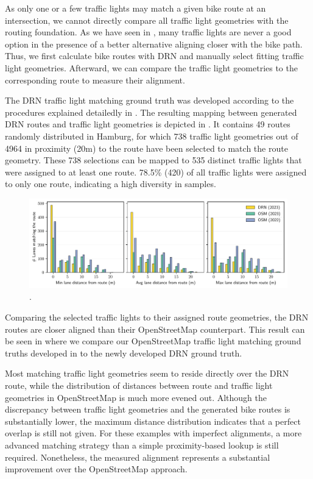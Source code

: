 As only one or a few traffic lights may match a given bike route at an intersection, we cannot directly compare all traffic light geometries with the routing foundation. As we have seen in , many traffic lights are never a good option in the presence of a better alternative aligning closer with the bike path. Thus, we first calculate bike routes with DRN and manually select fitting traffic light geometries. Afterward, we can compare the traffic light geometries to the corresponding route to measure their alignment. 

The DRN traffic light matching ground truth was developed according to the procedures explained detailedly in . The resulting mapping between generated DRN routes and traffic light geometries is depicted in . It contains 49 routes randomly distributed in Hamburg, for which 738 traffic light geometries out of 4964 in proximity (20m) to the route have been selected to match the route geometry. These 738 selections can be mapped to 535 distinct traffic lights that were assigned to at least one route. 78.5\% (420) of all traffic lights were assigned to only one route, indicating a high diversity in samples.

\begin{figure}[t]
\centering 
\includegraphics[width=\linewidth]{images/routing-lane-alignment.pdf}
\caption{.}
\label{fig:routing-lane-alignment}
\end{figure}

Comparing the selected traffic lights to their assigned route geometries, the DRN routes are closer aligned than their OpenStreetMap counterpart. This result can be seen in  where we compare our OpenStreetMap traffic light matching ground truths developed in  to the newly developed DRN ground truth. 

Most matching traffic light geometries seem to reside directly over the DRN route, while the distribution of distances between route and traffic light geometries in OpenStreetMap is much more evened out. Although the discrepancy between traffic light geometries and the generated bike routes is substantially lower, the maximum distance distribution indicates that a perfect overlap is still not given. For these examples with imperfect alignments, a more advanced matching strategy than a simple proximity-based lookup is still required. Nonetheless, the measured alignment represents a substantial improvement over the OpenStreetMap approach. 

